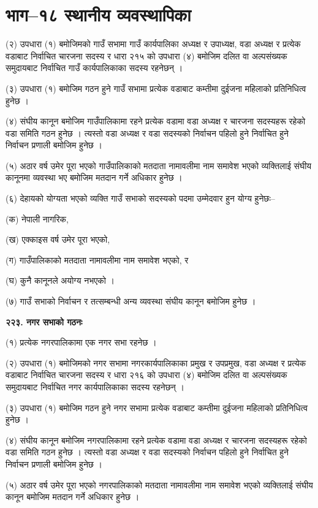 \section{भाग–१८ स्थानीय व्यवस्थापिका}

(२) उपधारा (१) बमोजिमको गाउँ सभामा गाउँ कार्यपालिका अध्यक्ष र उपाध्यक्ष, वडा अध्यक्ष र प्रत्येक वडाबाट निर्वाचित चारजना सदस्य र धारा २१५ को उपधारा (४) बमोजिम दलित वा अल्पसंख्यक समुदायबाट निर्वाचित गाउँ कार्यपालिकाका सदस्य रहनेछन् ।

(३) उपधारा (१) बमोजिम गठन हुने गाउँ सभामा प्रत्येक वडाबाट कम्तीमा दुईजना महिलाको प्रतिनिधित्व हुनेछ ।

(४) संघीय कानून बमोजिम गाउँपालिकामा रहने प्रत्येक वडामा वडा अध्यक्ष र चारजना सदस्यहरू रहेको वडा समिति गठन हुनेछ । त्यस्तो वडा अध्यक्ष र वडा सदस्यको निर्वाचन पहिलो हुने निर्वाचित हुने निर्वाचन प्रणाली बमोजिम हुनेछ ।

(५) अठार वर्ष उमेर पूरा भएको गाउँपालिकाको मतदाता नामावलीमा नाम समावेश भएको व्यक्तिलाई संघीय कानूनमा व्यवस्था भए बमोजिम मतदान गर्ने अधिकार हुनेछ ।

(६) देहायको योग्यता भएको व्यक्ति गाउँ सभाको सदस्यको पदमा उम्मेदवार हुन योग्य हुनेछः–

(क) नेपाली नागरिक,

(ख) एक्काइस वर्ष उमेर पूरा भएको,

(ग) गाउँपालिकाको मतदाता नामावलीमा नाम समावेश भएको, र

(घ) कुनै कानूनले अयोग्य नभएको ।

(७) गाउँ सभाको निर्वाचन र तत्सम्बन्धी अन्य व्यवस्था संघीय कानून बमोजिम हुनेछ ।

\textbf{२२३. नगर सभाको गठनः}

(१) प्रत्येक नगरपालिकामा एक नगर सभा रहनेछ ।

(२) उपधारा (१) बमोजिमको नगर सभामा नगरकार्यपालिकाका प्रमुख र उपप्रमुख, वडा अध्यक्ष र प्रत्येक वडाबाट निर्वाचित चारजना सदस्य र धारा २१६ को उपधारा (४) बमोजिम दलित वा अल्पसंख्यक समुदायबाट निर्वाचित नगर कार्यपालिकाका सदस्य रहनेछन् ।

(३) उपधारा (१) बमोजिम गठन हुने नगर सभामा प्रत्येक वडाबाट कम्तीमा दुईजना महिलाको प्रतिनिधित्व हुनेछ ।

(४) संघीय कानून बमोजिम नगरपालिकामा रहने प्रत्येक वडामा वडा अध्यक्ष र चारजना सदस्यहरू रहेको वडा समिति गठन हुनेछ । त्यस्तो वडा अध्यक्ष र वडा सदस्यको निर्वाचन पहिलो हुने निर्वाचित हुने निर्वाचन प्रणाली बमोजिम हुनेछ ।

(५) अठार वर्ष उमेर पूरा भएको नगरपालिकाको मतदाता नामावलीमा नाम समावेश भएको व्यक्तिलाई संघीय कानून बमोजिम मतदान
गर्ने अधिकार हुनेछ ।

